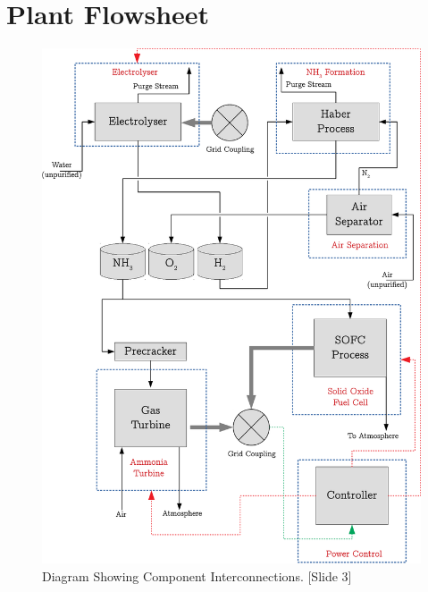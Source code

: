 \section{Plant Flowsheet}

\begin{figure}[H]
        \centering
        \includegraphics[scale=0.7]{plantdiagram.pdf}
        \caption{Diagram Showing Component Interconnections. [Slide 3]}
        \label{fig:plantglobaldiagram}
\end{figure}